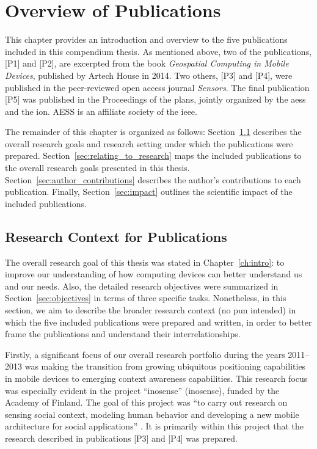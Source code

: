 \chapter{Overview of Publications}
\label{ch:overview_of_publications}

This chapter provides an introduction and overview to the five publications included in this compendium thesis. As mentioned above, two of the publications, [P1] and [P2], are excerpted from the book \emph{Geospatial Computing in Mobile Devices}, published by Artech House in 2014. Two others, [P3] and [P4], were published in the peer-reviewed open access journal \emph{Sensors}. The final publication [P5] was published in the Proceedings of the \gls{plans}, jointly organized by the \gls{aess} and the \gls{ion}. AESS is an affiliate society of the \gls{ieee}.

The remainder of this chapter is organized as follows: Section~\ref{sec:overall_research} describes the overall research goals and research setting under which the publications were prepared. Section~\ref{sec:relating_to_research} maps the included publications to the overall research goals presented in this thesis. Section~\ref{sec:author_contributions} describes the author's contributions to each publication. Finally, Section~\ref{sec:impact} outlines the scientific impact of the included publications.

\section{Research Context for Publications}
\label{sec:overall_research}

The overall research goal of this thesis was stated in Chapter~\ref{ch:intro}: to improve our understanding of how computing devices can better understand us and our needs. Also, the detailed research objectives were summarized in Section~\ref{sec:objectives} in terms of three specific tasks. Nonetheless, in this section, we aim to describe the broader research context (no pun intended) in which the five included publications were prepared and written, in order to better frame the publications and understand their interrelationships.

Firstly, a significant focus of our overall research portfolio during the years 2011--2013 was making the transition from growing ubiquitous positioning capabilities in mobile devices to emerging context awareness capabilities. This research focus was especially evident in the project ``\acrlong{inosense}'' (\acrshort{inosense}), funded by the Academy of Finland. The goal of this project was ``to carry out research on sensing social context, modeling human behavior and developing a new mobile architecture for social applications'' \cite{inosense2015}. It is primarily within this project that the research described in publications [P3] and [P4] was prepared.

